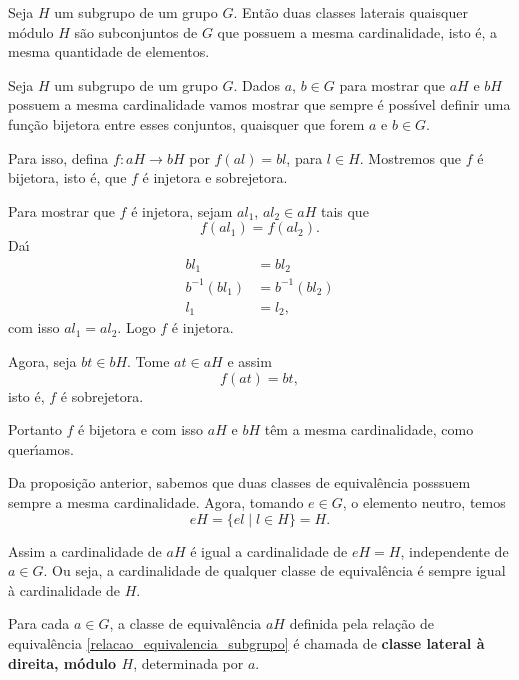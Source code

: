 \begin{proposicao}
    Seja $H$ um subgrupo de um grupo $G$. Ent\~ao duas classes laterais quaisquer m\'odulo $H$ s\~ao subconjuntos de $G$ que possuem a mesma cardinalidade, isto \'e, a mesma quantidade de elementos.
\end{proposicao}
\begin{prova}
	Seja $H$ um subgrupo de um grupo $G$. Dados $a$, $b \in G$ para mostrar que $aH$ e $bH$ possuem a mesma cardinalidade vamos mostrar que sempre \'e poss{\'\i}vel definir uma fun\c{c}\~ao bijetora entre esses conjuntos, quaisquer que forem $a$ e $b \in G$.

	Para isso, defina $f : aH \to bH$ por $f(al) = bl$, para $l \in H$. Mostremos que $f$ \'e bijetora, isto \'e, que $f$ \'e injetora e sobrejetora.

	Para mostrar que $f$ \'e injetora, sejam $al_1$, $al_2 \in aH$ tais que
	\[
		f(al_1) = f(al_2).
	\]
	Da{\'\i}
	\begin{align*}
		bl_1 &= bl_2\\
		b^{-1}(bl_1) &= b^{-1}(bl_2)\\
		l_1 &= l_2,
	\end{align*}
	com isso $al_1 = al_2$. Logo $f$ \'e injetora.

	Agora, seja $bt \in bH$. Tome $at \in aH$ e assim
	\[
		f(at) = bt,
	\]
	isto \'e, $f$ \'e sobrejetora.

	Portanto $f$ \'e bijetora e com isso $aH$ e $bH$ t\^em a mesma cardinalidade, como quer{\'\i}amos.
\end{prova}

\begin{observacao}
	Da proposi\c{c}\~ao anterior, sabemos que duas classes de equival\^encia posssuem sempre a mesma cardinalidade. Agora, tomando $e \in G$, o elemento neutro, temos
	\[
		eH = \{el \mid l \in H\} = H.
	\]

	Assim a cardinalidade de $aH$ \'e igual a cardinalidade de $eH = H$, independente de $a \in G$. Ou seja, a cardinalidade de qualquer classe de equival\^encia \'e sempre igual \`a cardinalidade de $H$.
\end{observacao}

\begin{definicao}
	Para cada $a \in G$, a classe de equival\^encia $aH$ definida pela rela\c{c}\~ao de equival\^encia \eqref{relacao_equivalencia_subgrupo} \'e chamada de \textbf{classe lateral \`a direita, m\'odulo $H$}, determinada por $a$.
\end{definicao}

